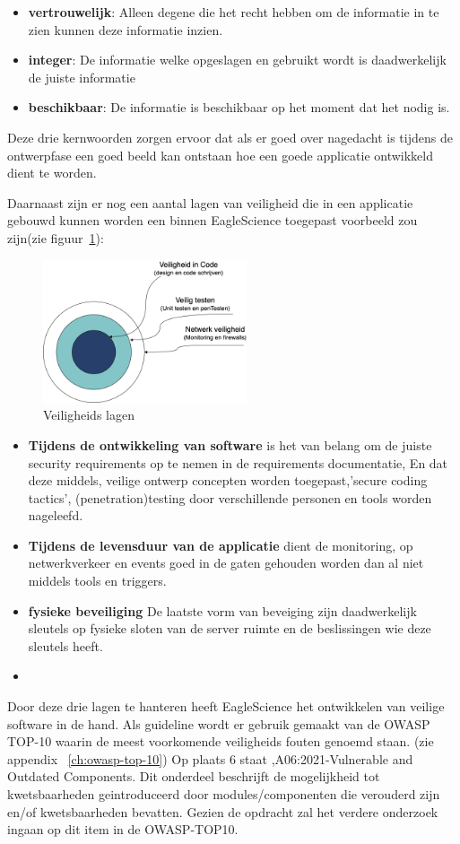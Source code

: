 \begin{itemize}
    \item \textbf{vertrouwelijk}: Alleen degene die het recht hebben om de informatie in te zien kunnen deze informatie inzien.
    \item \textbf{integer}: De informatie welke opgeslagen en gebruikt wordt is daadwerkelijk de juiste informatie
    \item \textbf{beschikbaar}: De informatie is beschikbaar op het moment dat het nodig is.
\end{itemize}
Deze drie kernwoorden zorgen ervoor dat als er goed over nagedacht is tijdens de ontwerpfase een goed beeld kan ontstaan hoe een goede applicatie ontwikkeld dient te worden.

Daarnaast zijn er nog een aantal lagen van veiligheid die in een applicatie gebouwd kunnen worden een binnen EagleScience toegepast voorbeeld zou zijn(zie figuur~\ref{fig:veiligheidslagen}):

\begin{figure}[H]
    \centering
    \includegraphics[width=6cm]{gfx/veiligheids lagen}
    \caption{Veiligheids lagen}
    \label{fig:veiligheidslagen}
\end{figure}

\begin{itemize}
    \item \textbf{Tijdens de ontwikkeling van software} is het van belang om de juiste security requirements op te nemen in de requirements documentatie, En dat deze middels, veilige ontwerp concepten worden toegepast,'secure coding tactics', (penetration)testing door verschillende personen en tools worden nageleefd.
    \item \textbf{Tijdens de levensduur van de applicatie} dient de monitoring, op netwerkverkeer en events goed in de gaten gehouden worden dan al niet middels tools en triggers.
    \item \textbf{fysieke beveiliging} De laatste vorm van beveiging zijn daadwerkelijk sleutels op fysieke sloten van de server ruimte en de beslissingen wie deze sleutels heeft.
\item \end{itemize}
Door deze drie lagen te hanteren heeft EagleScience het ontwikkelen van veilige software in de hand. Als guideline wordt er gebruik gemaakt van de OWASP TOP-10 waarin de meest voorkomende veiligheids fouten genoemd staan. (zie appendix ~\ref{ch:owasp-top-10}) Op plaats 6 staat ,A06:2021-Vulnerable and Outdated Components. Dit onderdeel beschrijft de mogelijkheid tot kwetsbaarheden geintroduceerd door modules/componenten die verouderd zijn en/of kwetsbaarheden bevatten. Gezien de opdracht zal het verdere onderzoek ingaan op dit item in de OWASP-TOP10.

